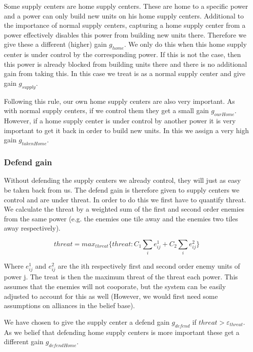 \documentclass[a4paper]{article} %
\begin{document}
Some supply centers are home supply centers. These are home to a specific power and a power can only build new units on his home supply centers. Additional to the importance of normal supply centers, capturing a home supply center from a power effectively disables this power from building new units there. Therefore we give these a different (higher) gain $g_{home}$. We only do this when this home supply center is under control by the corresponding power. If this is not the case, then this power is already blocked from building units there and there is no additional gain from taking this. In this case we treat is as a normal supply center and give gain $g_{supply}$.

Following this rule, our own home supply centers are also very important. As with normal supply centers, if we control them they get a small gain $g_{ourHome}$. However, if a home supply center is under control by another power it is very important to get it back in order to build new units. In this we assign a very high gain $g_{takenHome}$. 

\subsubsection{Defend gain}

Without defending the supply centers we already control, they will just as easy be taken back from us. The defend gain is therefore given to supply centers we control and are under threat. In order to do this we first have to quantify threat. We calculate the threat by a weighted sum of the first and second order enemies from the same power (e.g. the enemies one tile away and the enemies two tiles away respectively). 

$$threat = max_{threat}\{ threat : C_1 \sum_{i} e^{1}_{ij} + C_2 \sum_{i} e^{2}_{ij}\}$$

Where $e^1_{ij}$ and $e^2_{ij}$ are the ith respectively first and second order enemy units of power j. The treat is then the maximum threat of the threat each power. This assumes that the enemies will not cooporate, but the system can be easily adjusted to account for this as well (However, we would first need some assumptions on  alliances in the belief base). 

We have chosen to give the supply center a defend gain $g_{defend}$ if $threat > \varepsilon_{threat}$. As we belief that defending home supply centers is more important these get a different gain $g_{defendHome}$. 
\end{document}
